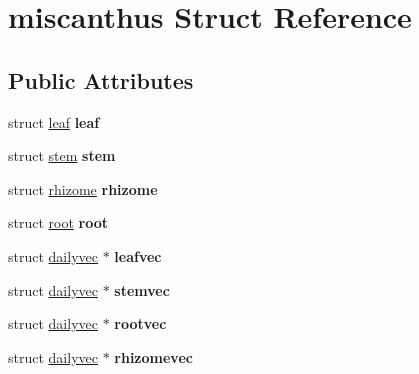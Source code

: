 \hypertarget{structmiscanthus}{\section{miscanthus Struct Reference}
\label{structmiscanthus}
}
\subsection*{Public Attributes}
\begin{DoxyCompactItemize}
\item 
\hypertarget{structmiscanthus_a47de44e34e041cbfb3fa8dae31e6d966}{struct \hyperlink{structleaf}{leaf} {\bfseries leaf}}\label{structmiscanthus_a47de44e34e041cbfb3fa8dae31e6d966}

\item 
\hypertarget{structmiscanthus_a3ee5ab059b481b1909b2cbad423cc4aa}{struct \hyperlink{structstem}{stem} {\bfseries stem}}\label{structmiscanthus_a3ee5ab059b481b1909b2cbad423cc4aa}

\item 
\hypertarget{structmiscanthus_a1e56dc152f62eec62c97419b2f7e46cb}{struct \hyperlink{structrhizome}{rhizome} {\bfseries rhizome}}\label{structmiscanthus_a1e56dc152f62eec62c97419b2f7e46cb}

\item 
\hypertarget{structmiscanthus_a2d4a15ad728fcc280384ac7c8d0f9c0d}{struct \hyperlink{structroot}{root} {\bfseries root}}\label{structmiscanthus_a2d4a15ad728fcc280384ac7c8d0f9c0d}

\item 
\hypertarget{structmiscanthus_a97171fbed19ec1062c490d34a2d12cbc}{struct \hyperlink{structdailyvec}{dailyvec} $\ast$ {\bfseries leafvec}}\label{structmiscanthus_a97171fbed19ec1062c490d34a2d12cbc}

\item 
\hypertarget{structmiscanthus_a8a58d9103022ce42adf5182e1915c795}{struct \hyperlink{structdailyvec}{dailyvec} $\ast$ {\bfseries stemvec}}\label{structmiscanthus_a8a58d9103022ce42adf5182e1915c795}

\item 
\hypertarget{structmiscanthus_a0b650c1462ca8c6afda8b2b7d2d2c2da}{struct \hyperlink{structdailyvec}{dailyvec} $\ast$ {\bfseries rootvec}}\label{structmiscanthus_a0b650c1462ca8c6afda8b2b7d2d2c2da}

\item 
\hypertarget{structmiscanthus_a170c933ffeb4f651204e0bd7851bfcc4}{struct \hyperlink{structdailyvec}{dailyvec} $\ast$ {\bfseries rhizomevec}}\label{structmiscanthus_a170c933ffeb4f651204e0bd7851bfcc4}


\end{DoxyCompactItemize}
